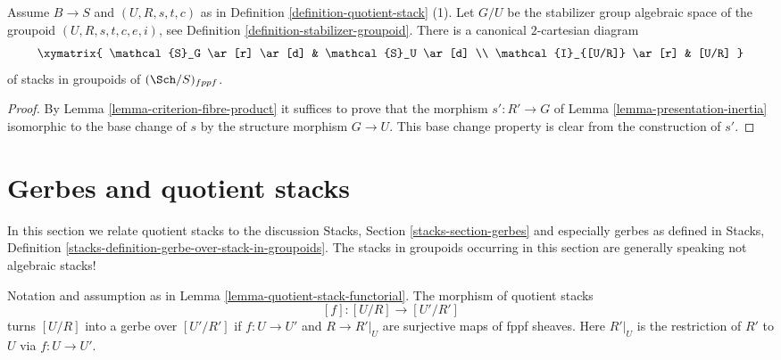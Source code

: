 \begin{lemma}
\label{lemma-2-cartesian-inertia}
Assume $B \to S$ and $(U, R, s, t, c)$ as in
Definition \ref{definition-quotient-stack} (1).
Let $G/U$ be the stabilizer group algebraic space of the groupoid
$(U, R, s, t, c, e, i)$, see
Definition \ref{definition-stabilizer-groupoid}.
There is a canonical $2$-cartesian diagram
$$
\xymatrix{
\mathcal{S}_G \ar[r] \ar[d] & \mathcal{S}_U \ar[d] \\
\mathcal{I}_{[U/R]} \ar[r] & [U/R]
}
$$
of stacks in groupoids of $(\Sch/S)_{fppf}$.
\end{lemma}

\begin{proof}
By
Lemma \ref{lemma-criterion-fibre-product}
it suffices to prove that the morphism
$s' : R' \to G$ of
Lemma \ref{lemma-presentation-inertia}
isomorphic to the base change of $s$ by the structure
morphism $G \to U$. This base change property is
clear from the construction of $s'$.
\end{proof}







\section{Gerbes and quotient stacks}
\label{section-gerbes}

\noindent
In this section we relate quotient stacks to the discussion
Stacks, Section \ref{stacks-section-gerbes}
and especially gerbes as defined in
Stacks, Definition \ref{stacks-definition-gerbe-over-stack-in-groupoids}.
The stacks in groupoids occurring in this section
are generally speaking not algebraic stacks!

\begin{lemma}
\label{lemma-when-gerbe}
Notation and assumption as in
Lemma \ref{lemma-quotient-stack-functorial}.
The morphism of quotient stacks
$$
[f] : [U/R] \longrightarrow [U'/R']
$$
turns $[U/R]$ into a gerbe over $[U'/R']$ if $f : U \to U'$ and
$R \to R'|_U$ are surjective maps of fppf sheaves. Here $R'|_U$ is
the restriction of $R'$ to $U$ via $f : U \to U'$.
\end{lemma}


